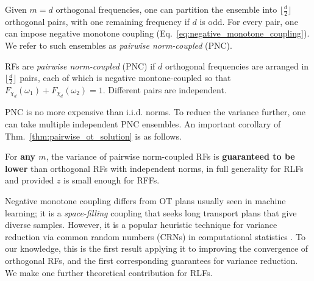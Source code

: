 Given $m=d$ orthogonal frequencies, one can partition the ensemble into $\lfloor \frac{d}{2} \rfloor$ orthogonal pairs, with one remaining frequency if $d$ is odd. 
For every pair, one can impose negative monotone coupling (Eq.~\ref{eq:negative_monotone_coupling}). 
We refer to such ensembles as \emph{pairwise norm-coupled} (PNC).

\begin{tcolorbox}[colback=gray!10!white,colframe=gray!50!black,arc=0mm,boxrule=0.5pt]
\begin{definition} \label{def:coupled_norms_def}
RFs are \emph{pairwise norm-coupled} (PNC) if $d$ orthogonal frequencies  are arranged in $\lfloor \frac{d}{2}\rfloor$ pairs, each of which is negative montone-coupled so that $F_{\chi_d}(\omega_1) + F_{\chi_d}(\omega_2) = 1$. Different pairs are independent.
\end{definition}
\end{tcolorbox}

PNC is no more expensive than i.i.d. norms. 
To reduce the variance further, one can take multiple independent PNC ensembles.
An important corollary of Thm.~\ref{thm:pairwise_ot_solution} is as follows. 

\begin{corollary} \label{corr:norm_coupled_better}
    For \textbf{any $m$}, the variance of pairwise norm-coupled RFs is \textbf{guaranteed to be lower} than orthogonal RFs with independent norms, in full generality for RLFs and provided $z$ is small enough for RFFs.
\end{corollary}
Negative monotone coupling differs from OT plans usually seen in machine learning; it is a \emph{space-filling} coupling that seeks long transport plans that give diverse samples. 
However, it is a popular heuristic technique for variance reduction via common random numbers (CRNs) in computational statistics \citep{glasserman1992some}. 
To our knowledge, this is the first result applying it to improving the convergence of orthogonal RFs, and the first corresponding guarantees for variance reduction.
We make one further theoretical contribution for RLFs.

